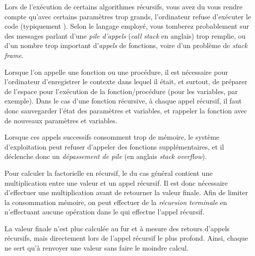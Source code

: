 \documentclass[11pt,a4paper]{article}
\begin{document}
Lors de l'exécution de certains algorithmes récursifs, vous avez du vous rendre compte qu'avec certains paramètres trop grands, l'ordinateur refuse d'exécuter le code (typiquement ).
Selon le langage employé, vous tomberez probablement sur des messages parlant d'une \textit{pile d'appels} (\textit{call stack} en anglais) trop remplie, ou d'un nombre trop important d'\textit{appels} de fonctions, voire d'un problème de \textit{stack frame}.

Lorsque l'on appelle une fonction ou une procédure, il est nécessaire pour l'ordinateur d'enregistrer le contexte dans lequel il était, et surtout, de préparer de l'espace pour l'exécution de la fonction/procédure (pour les variables, par exemple).
Dans le cas d'une fonction récursive, à chaque appel récursif, il faut donc sauvegarder l'état des paramètres et variables, et rappeler la fonction avec de nouveaux paramètres et variables.

Lorsque ces appels successifs consomment trop de mémoire, le système d'exploitation peut refuser d'appeler des fonctions supplémentaires, et il déclenche donc un \textit{dépassement de pile} (en anglais \textit{stack overflow}).

\medskip

Pour calculer la factorielle en récursif, le  du cas général contient une multiplication entre une valeur et un appel récursif.
Il est donc nécessaire d'effectuer une multiplication avant de retourner la valeur finale.
Afin de limiter la consommation mémoire, on peut effectuer de la \textit{récursion terminale} en n'effectuant aucune opération dans le  qui effectue l'appel récursif.

La valeur finale n'est plus calculée au fur et à mesure des retours d'appels récursifs, mais directement lors de l'appel récursif le plus profond.
Ainsi, chaque  ne sert qu'à renvoyer une valeur sans faire le moindre calcul.

\medskip
\end{document}
